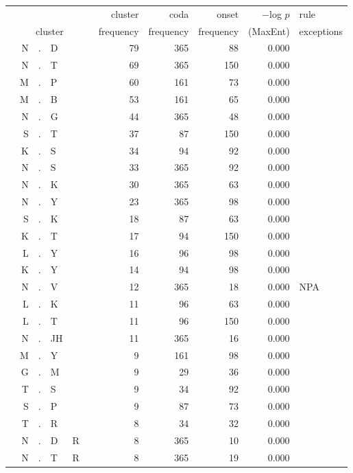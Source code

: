 \documentclass[12pt]{article}
\begin{document}
\begin{longtable}{r@{ } r@{ } c@{ } l@{ } l@{ } l@{ } r r r r l }
\toprule
 &   &   &  &   &  &  cluster  &  coda  &  onset  &  $-$log $p$  &  rule \\
\multicolumn{6}{c}{cluster}  &  frequency  &  frequency  &  frequency  &  (MaxEnt)  &  exceptions\\
\midrule
 & N & . & D &  &  & 79 & 365 & 88 & 0.000 &  \\
 & N & . & T &  &  & 69 & 365 & 150 & 0.000 &  \\
 & M & . & P &  &  & 60 & 161 & 73 & 0.000 &  \\
 & M & . & B &  &  & 53 & 161 & 65 & 0.000 &  \\
 & N & . & G &  &  & 44 & 365 & 48 & 0.000 &  \\
 & S & . & T &  &  & 37 & 87 & 150 & 0.000 &  \\
 & K & . & S &  &  & 34 & 94 & 92 & 0.000 &  \\
 & N & . & S &  &  & 33 & 365 & 92 & 0.000 &  \\
 & N & . & K &  &  & 30 & 365 & 63 & 0.000 &  \\
 & N & . & Y &  &  & 23 & 365 & 98 & 0.000 &  \\
 & S & . & K &  &  & 18 & 87 & 63 & 0.000 &  \\
 & K & . & T &  &  & 17 & 94 & 150 & 0.000 &  \\
 & L & . & Y &  &  & 16 & 96 & 98 & 0.000 &  \\
 & K & . & Y &  &  & 14 & 94 & 98 & 0.000 &  \\
 & N & . & V &  &  & 12 & 365 & 18 & 0.000 & \textsc{NPA} \\
 & L & . & K &  &  & 11 & 96 & 63 & 0.000 &  \\
 & L & . & T &  &  & 11 & 96 & 150 & 0.000 &  \\
 & N & . & JH &  &  & 11 & 365 & 16 & 0.000 &  \\
 & M & . & Y &  &  & 9 & 161 & 98 & 0.000 &  \\
 & G & . & M &  &  & 9 & 29 & 36 & 0.000 &  \\
 & T & . & S &  &  & 9 & 34 & 92 & 0.000 &  \\
 & S & . & P &  &  & 9 & 87 & 73 & 0.000 &  \\
 & T & . & R &  &  & 8 & 34 & 32 & 0.000 &  \\
 & N & . & D & R &  & 8 & 365 & 10 & 0.000 &  \\
 & N & . & T & R &  & 8 & 365 & 19 & 0.000 &  \\

\end{longtable}
\end{document}
